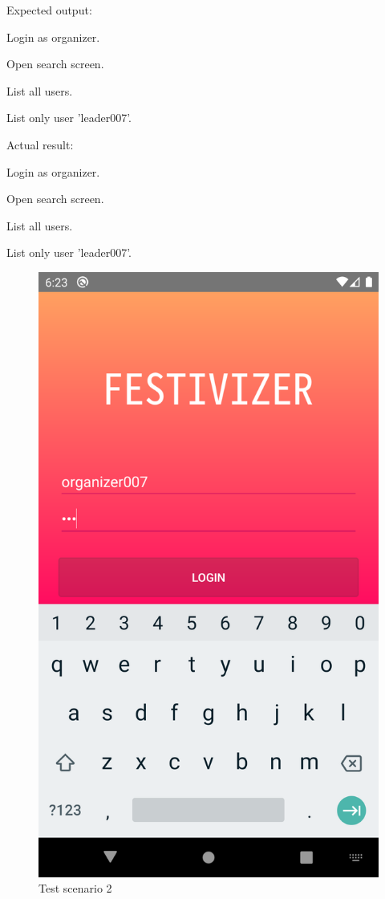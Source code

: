 	 		Expected output:
	 		\begin{packed_enum}
	 			\item Login as organizer.
	 			\item Open search screen.
	 			\item List all users.
	 			\item List only user 'leader007'.
	 		\end{packed_enum}
	 		
	 		Actual result:
	 		\begin{packed_enum}
	 			\item Login as organizer.
	 			\item Open search screen.
	 			\item List all users.
	 			\item List only user 'leader007'.
	 		\end{packed_enum}
	 		
	 		\begin{figure}[H]
	 			\includegraphics[width=\linewidth]{images/test_Screens/test_scenario_2-1.png}
	 			\caption{Test scenario 2}
	 			\label{fig:espresso_2_1}
	 		\end{figure}
	 		
